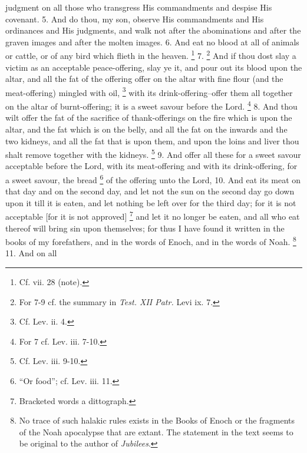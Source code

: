 judgment on all those who transgress His commandments and despise His covenant. 5. And do thou, my son, observe His commandments and His ordinances and His judgments, and walk not after the abominations and after the graven images and after the molten images. 6. And eat no blood at all of animals or cattle, or of any bird which flieth in the heaven. \footnote{Cf. vii. 28 (note).} 7. \footnote{For 7-9 cf. the summary in \emph{Test. XII Patr.} Levi ix. 7.} And if thou dost slay a victim as an acceptable peace-offering, slay ye it, and pour out its blood upon the altar, and all the fat of the offering offer on the altar with fine flour (and the meat-offering) mingled with oil, \footnote{Cf. Lev. ii. 4.} with its drink-offering--offer them all together on the altar of burnt-offering; it is a sweet savour before the Lord. \footnote{For 7 cf. Lev. iii. 7-10.} 8. And thou wilt offer the fat of the sacrifice of thank-offerings on the fire which is upon the altar, and the fat which is on the belly, and all the fat on the inwards and the two kidneys, and all the fat that is upon them, and upon the loins and liver thou shalt remove together with the kidneys. \footnote{Cf. Lev. iii. 9-10.} 9. And offer all these for a sweet savour acceptable before the Lord, with its meat-offering and with its drink-offering, for a sweet savour, the bread \footnote{``Or food''; cf. Lev. iii. 11.} of the offering unto the Lord, 10. And eat its meat on that day and on the second day, and let not the sun on the second day go down upon it till it is eaten, and let nothing be left over for the third day; for it is not acceptable [for it is not approved] \footnote{Bracketed words a dittograph.} and let it no longer be eaten, and all who eat thereof will bring sin upon themselves; for thus I have found it written in the books of my forefathers, and in the words of Enoch, and in the words of Noah. \footnote{No trace of such halakic rules exists in the Books of Enoch or the fragments of the Noah apocalypse that are extant. The statement in the text seems to be original to the author of \emph{Jubilees}.} 11. And on all


